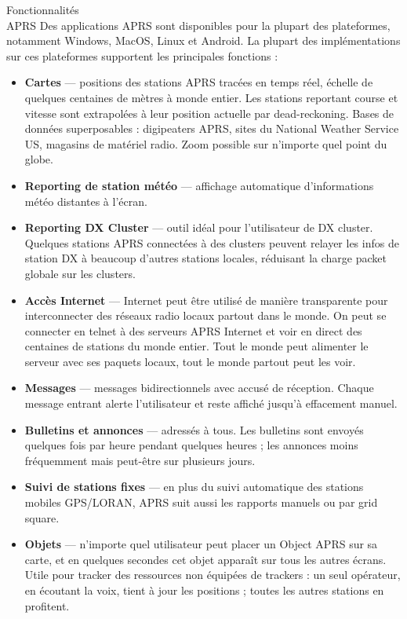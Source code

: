 \begin{aprssideblock}{Fonctionnalités\\APRS}
Des applications APRS sont disponibles pour la plupart des plateformes,
notamment Windows, MacOS, Linux et Android. La plupart des
implémentations sur ces plateformes supportent les
principales fonctions :

\begin{itemize}
\tightlist
\item
  \textbf{Cartes} --- positions des stations APRS tracées en temps réel,
  échelle de quelques centaines de mètres à monde entier. Les stations
  reportant course et vitesse sont extrapolées à leur position actuelle
  par dead-reckoning. Bases de données superposables : digipeaters APRS,
  sites du National Weather Service US, magasins de matériel radio. Zoom
  possible sur n'importe quel point du globe.
\item
  \textbf{Reporting de station météo} --- affichage automatique
  d'informations météo distantes à l'écran.
\item
  \textbf{Reporting DX Cluster} --- outil idéal pour l'utilisateur de DX
  cluster. Quelques stations APRS connectées à des clusters peuvent
  relayer les infos de station DX à beaucoup d'autres stations locales,
  réduisant la charge packet globale sur les clusters.
\item
  \textbf{Accès Internet} --- Internet peut être utilisé de manière
  transparente pour interconnecter des réseaux radio locaux partout dans
  le monde. On peut se connecter en telnet à des serveurs APRS Internet
  et voir en direct des centaines de stations du monde entier. Tout le
  monde peut alimenter le serveur avec ses paquets locaux, tout le monde
  partout peut les voir.
\item
  \textbf{Messages} --- messages bidirectionnels avec accusé de
  réception. Chaque message entrant alerte l'utilisateur et reste
  affiché jusqu'à effacement manuel.
\item
  \textbf{Bulletins et annonces} --- adressés à tous. Les bulletins sont
  envoyés quelques fois par heure pendant quelques heures ; les annonces
  moins fréquemment mais peut-être sur plusieurs jours.
\item
  \textbf{Suivi de stations fixes} --- en plus du suivi automatique des
  stations mobiles GPS/LORAN, APRS suit aussi les rapports manuels ou
  par grid square.
\item
  \textbf{Objets} --- n'importe quel utilisateur peut placer un Object
  APRS sur sa carte, et en quelques secondes cet objet apparaît sur tous
  les autres écrans. Utile pour tracker des ressources non équipées de
  trackers : un seul opérateur, en écoutant la voix, tient à jour les
  positions ; toutes les autres stations en profitent.
\end{itemize}
\end{aprssideblock}


